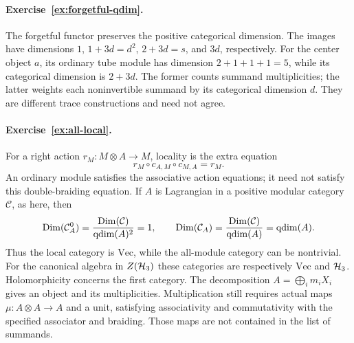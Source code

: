 \paragraph{Exercise~\ref{ex:forgetful-qdim}.}
\label{sol:ex:forgetful-qdim}
The forgetful functor preserves the positive categorical dimension.
The images have dimensions
$1$, $1+3d=d^2$, $2+3d=s$, and $3d$, respectively.
For the center object $a$, its ordinary tube module has dimension
$2+1+1+1=5$, while its categorical dimension is $2+3d$.
The former counts summand multiplicities; the latter weights each
noninvertible summand by its categorical dimension $d$.  They are
different trace constructions and need not agree.



\paragraph{Exercise~\ref{ex:all-local}.}
\label{sol:ex:all-local}
For a right action $r_M:M\otimes A\to M$, locality is the extra
equation
\[
 r_M\circ c_{A,M}\circ c_{M,A}=r_M.
\]
An ordinary module satisfies the associative action equations;
it need not satisfy this double-braiding equation. If $A$ is
Lagrangian in a positive modular category $\mathcal C$, as here, then
\[
 \operatorname{Dim}(\mathcal C_A^0)
   =\frac{\operatorname{Dim}(\mathcal C)}{\operatorname{qdim}(A)^2}=1,
 \qquad
 \operatorname{Dim}(\mathcal C_A)
   =\frac{\operatorname{Dim}(\mathcal C)}{\operatorname{qdim}(A)}=\operatorname{qdim}(A).
\]
Thus the local category is $\mathrm{Vec}$, while the all-module
category can be nontrivial. For the canonical algebra in
$Z(\mathcal H_3)$ these categories are respectively $\mathrm{Vec}$ and
$\mathcal H_3$. Holomorphicity concerns the first category.
The decomposition $A=\bigoplus_i m_iX_i$ gives an object and its
multiplicities. Multiplication still requires actual maps
$\mu:A\otimes A\to A$ and a unit, satisfying associativity and
commutativity with the specified associator and braiding. Those
maps are not contained in the list of summands.

